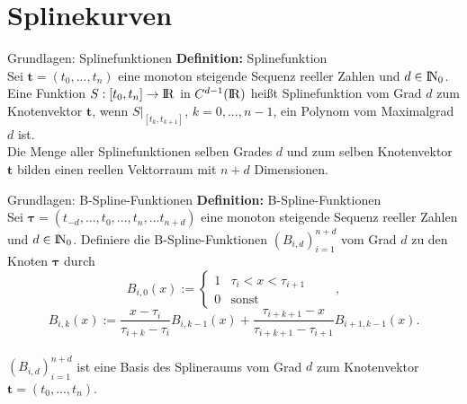 \section{Splinekurven} {

\begin{frame}{Grundlagen: Splinefunktionen}
\textbf{Definition:} Splinefunktion \\
Sei $\mathbf{t}=(t_0,...,t_n)$ eine monoton steigende Sequenz reeller Zahlen und $d \in {\rm I\!N}_0$. Eine Funktion $S:[t_0,t_n] \rightarrow {\rm I\!R}$ in $C^{d-1}({\rm I\!R})$ heißt Splinefunktion vom Grad $d$ zum Knotenvektor $\mathbf{t}$, wenn $S|_{[t_{k},t_{k+1}]}$, $k=0,...,n-1$, ein Polynom vom Maximalgrad $d$ ist. 
\\[1.0cm]

Die Menge aller Splinefunktionen selben Grades $d$ und zum selben Knotenvektor $\mathbf{t}$ bilden einen reellen Vektorraum mit $n+d$ Dimensionen. 
\\
\end{frame}

\begin{frame}{Grundlagen: B-Spline-Funktionen}
\textbf{Definition:} B-Spline-Funktionen \\
Sei $\mathbf{\tau}=(t_{-d},...,t_0,...,t_n,...t_{n+d})$ eine monoton steigende Sequenz reeller Zahlen und $d \in {\rm I\!N}_0$. Definiere die B-Spline-Funktionen $(B_{i,d})_{i=1}^{n+d}$ vom Grad $d$ zu den Knoten $\mathbf{\tau}$ durch 
\[
B_{i,0}(x) := \begin{cases} 1& \tau_i<x<\tau_{i+1} \\ 0& \text{sonst} \end{cases} \qquad ,
\]
\[
B_{i,k}(x) := \frac{x-\tau_i}{\tau_{i+k}-\tau_i}B_{i,k-1}(x) + \frac{\tau_{i+k+1}-x}{\tau_{i+k+1}-\tau_{i+1}}B_{i+1,k-1}(x)
.
\]
\\[1.0cm]

$(B_{i,d})_{i=1}^{n+d}$ ist eine Basis des Splineraums vom Grad $d$ zum Knotenvektor $\mathbf{t}=(t_0,...,t_n)$.
\\
\end{frame}

}
